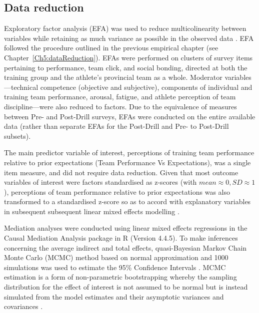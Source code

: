 \begin{CJK}{UTF8}{gbsn}


\subsection{Data reduction}
Exploratory factor analysis (EFA) was used to reduce multicolinearity between variables while retaining as much variance as possible in the observed data \citep[see Appendix~\ref{app8:EFA}]{Yong2013}. EFA followed the procedure outlined in the previous empirical chapter (see Chapter~\ref{Ch5:dataReduction}).
EFAs were performed on clusters of survey items pertaining to performance, team click, and social bonding, directed at both the training group and the athlete's provincial team as a whole.  Moderator variables---technical competence (objective and subjective), components of individual and training team performance, arousal, fatigue, and athlete perception of team discipline---were also reduced to factors. Due to the equivalence of measures between Pre- and Post-Drill surveys, EFAs were conducted on the entire available data (rather than separate EFAs for the Post-Drill and Pre- to Post-Drill subsets).




The main predictor variable of interest, perceptions of training team performance relative to prior expectations (Team Performance Vs Expectations), was a single item measure, and did not require data reduction.  Given that most outcome variables of interest were factors standardised as z-scores (with $mean \approx 0, SD \approx 1$), perceptions of team performance relative to prior expectations was also transformed to a standardised z-score so as to accord with explanatory variables in subsequent subsequent linear mixed effects modelling \citep[for an explanation, see][1058]{Beckmann2003}.


Mediation analyses were conducted using linear mixed effects regressions in the Causal Mediation Analysis package in R (Version 4.4.5).  To make inferences concerning the average indirect and total effects, quasi-Bayesian Markov Chain Monte Carlo (MCMC) method based on normal approximation and 1000 simulations was used to estimate the 95\% Confidence Intervals \citep{Tofighi2016a,Imai2010}. MCMC estimation is a form of non-parametric bootstrapping whereby the sampling distribution for the effect of interest is not assumed to be normal but is instead simulated from the model estimates and their asymptotic variances and covariances \citep{Preacher2008}.


\end{CJK}
